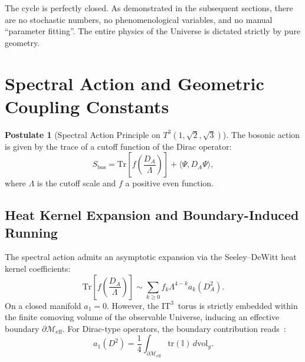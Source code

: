 \documentclass[onecolumn,aps,prd,superscriptaddress,nofootinbib,amsmath,amssymb]{revtex4-2}
\theoremstyle{definition}
\newtheorem{postulate}[theorem]{Postulate}
\theoremstyle{remark}
\newcommand{\ITthree}{\ensuremath{\mathrm{IT}^3}}
\newcommand{\Tthree}{T^3(1,\sqrt{2},\sqrt{3})}
\begin{document}
The cycle is perfectly closed. As demonstrated in the subsequent sections, there are no stochastic numbers, no phenomenological variables, and no manual ``parameter fitting''. The entire physics of the Universe is dictated strictly by pure geometry.

\section{Spectral Action and Geometric Coupling Constants}
\label{sec:spectral_action}

\begin{postulate}[Spectral Action Principle on $\Tthree$]
The bosonic action is given by the trace of a cutoff function of the Dirac operator:
\begin{equation}
S_{\text{bos}} = \text{Tr}\left[ f\left( \frac{D_A}{\Lambda} \right) \right] + \langle \Psi, D_A \Psi \rangle,
\label{eq:spectral_action}
\end{equation}
where $\Lambda$ is the cutoff scale and $f$ a positive even function.
\end{postulate}

\subsection{Heat Kernel Expansion and Boundary-Induced Running}
\label{subsec:alpha_heat_kernel}

The spectral action admits an asymptotic expansion via the Seeley--DeWitt heat kernel coefficients:
\begin{equation}
\text{Tr}\left[ f\left( \frac{D_A}{\Lambda} \right) \right] \sim \sum_{k \geq 0} f_{k} \Lambda^{4-k} a_k(D_A^2).
\label{eq:heat_kernel}
\end{equation}
On a closed manifold $a_1=0$. However, the \ITthree\ torus is strictly embedded within the finite comoving volume of the observable Universe, inducing an effective boundary $\partial \mathcal{M}_{\text{eff}}$. For Dirac-type operators, the boundary contribution reads~\cite{gilkey1995,vassilevich2003}:
\begin{equation}
a_1(D^2) = \frac{1}{4} \int_{\partial \mathcal{M}_{\text{eff}}} \text{tr}(\mathbb{I}) \, d\text{vol}_{y}.
\label{eq:a1_boundary}
\end{equation}
\end{document}
